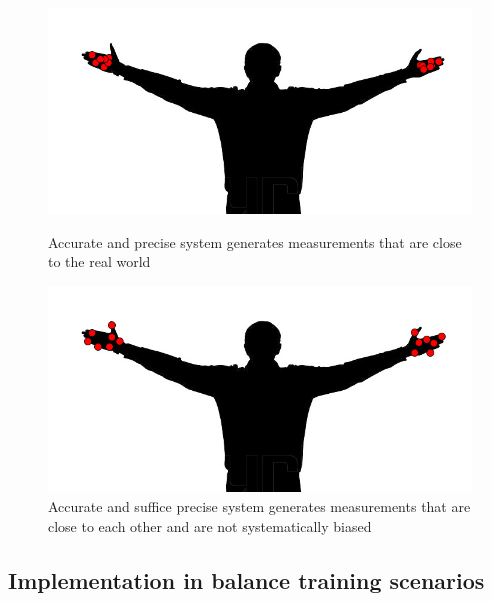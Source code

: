 \begin{figure}[htb]
	\centering
	\begin{minipage}[t]{0.49\linewidth}
		\centering
		\includegraphics[width=1\linewidth]{Pictures/systemAccuratePrecise}
		\caption{Accurate and precise system generates measurements that are close to the real world \cite{Woolford2015-ub}}
		\label{fig:systemAccuratePrecise}
	\end{minipage}
	\hfill
	\begin{minipage}[t]{0.49\linewidth}
		\centering
		\includegraphics[width=1\linewidth]{Pictures/systemAccurateImprecise}
		\caption{Accurate and suffice precise system generates measurements that are close to each other and are not systematically biased \cite{Woolford2015-ub}}
		\label{fig:systemAccurateImprecise}
	\end{minipage}
\end{figure}


\subsection{Implementation in balance training scenarios}


